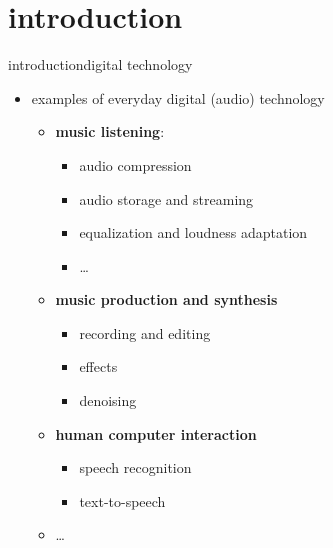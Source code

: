 



\subtitle{Part 2: Introduction}


	

\section{introduction}
\begin{frame}{introduction}{digital technology}
    \begin{itemize}
        \item   examples of everyday digital (audio) technology
            \begin{itemize}
                \item   \textbf{music listening}:
                    \begin{itemize}
                        \item   audio compression
                        \item   audio storage and streaming
                        \item   equalization and loudness adaptation
                        \item   \ldots
                    \end{itemize}
                \smallskip
                \item   \textbf{music production and synthesis}
                    \begin{itemize}
                        \item   recording and editing
                        \item   effects
                        \item   denoising
                    \end{itemize}
                \smallskip
                \item   \textbf{human computer interaction}
                    \begin{itemize}
                        \item   speech recognition
                        \item   text-to-speech
                    \end{itemize}
                \smallskip
                \item   \ldots
            \end{itemize}
    \end{itemize}
\end{frame}

